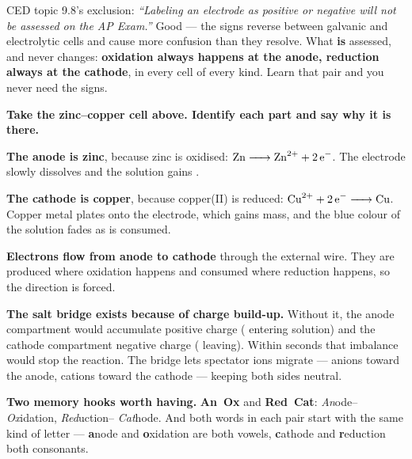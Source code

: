 \documentclass{apchem-worksheet}
\begin{document}
\begin{apcnote}
CED topic 9.8's exclusion: \emph{``Labeling an electrode as positive or
negative will not be assessed on the AP Exam.''} Good --- the signs
reverse between galvanic and electrolytic cells and cause more
confusion than they resolve. What \textbf{is} assessed, and never
changes: \textbf{oxidation always happens at the anode, reduction
always at the cathode}, in every cell of every kind. Learn that pair and
you never need the signs.
\end{apcnote}

\begin{workedexample}
\textbf{Take the zinc--copper cell above. Identify each part and say
why it is there.}

\textbf{The anode is zinc}, because zinc is oxidised:
$\ce{Zn -> Zn^2+ + 2e-}$. The electrode slowly dissolves and the solution
gains .

\textbf{The cathode is copper}, because copper(II) is reduced:
$\ce{Cu^2+ + 2e- -> Cu}$. Copper metal plates onto the electrode, which
gains mass, and the blue colour of the solution fades as  is
consumed.

\textbf{Electrons flow from anode to cathode} through the external
wire. They are produced where oxidation happens and consumed where
reduction happens, so the direction is forced.

\textbf{The salt bridge exists because of charge build-up.} Without it,
the anode compartment would accumulate positive charge (
entering solution) and the cathode compartment negative charge
( leaving). Within seconds that imbalance would stop the
reaction. The bridge lets spectator ions migrate --- anions toward the
anode, cations toward the cathode --- keeping both sides neutral.

\textbf{Two memory hooks worth having.} \textbf{An~Ox} and
\textbf{Red~Cat}: \emph{An}ode--\emph{Ox}idation, \emph{Red}uction--%
\emph{Cat}hode. And both words in each pair start with the same kind of
letter --- \textbf{a}node and \textbf{o}xidation are both vowels,
\textbf{c}athode and \textbf{r}eduction both consonants.
\end{workedexample}
\end{document}
